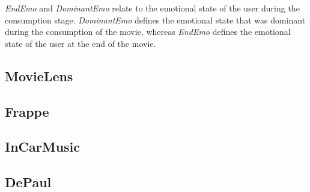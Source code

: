\textit{EndEmo} and \textit{DominantEmo} relate to the emotional state of the user during the consumption stage.
\textit{DominantEmo} defines the emotional state that was dominant during the consumption of the movie, whereas \textit{EndEmo} defines the emotional state of the user at the end of the movie.



\subsection{MovieLens}
\subsection{Frappe}
\subsection{InCarMusic}
\subsection{DePaul}


